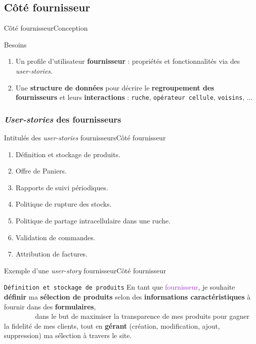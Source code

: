 \documentclass[usenames,dvipsnames]{beamer}
\begin{document}
\subsection{Côté fournisseur}
\begin{frame}{Côté fournisseur}{Conception}
\begin{block}{Besoins}
\begin{enumerate}
  \item Un profile d'utilisateur \textbf{fournisseur} : propriétés et fonctionnalités via des \textit{user-stories}.
  \item Une \textbf{structure de données} pour décrire le \textbf{regroupement des fournisseurs} et leurs \textbf{interactions} : \texttt{ruche}, \texttt{opérateur cellule}, \texttt{voisins}, $\dots$
\end{enumerate}
\end{block}
\end{frame}

\subsubsection*{\protect\textit{User-stories} des fournisseurs}
\begin{frame}{Intitulés des \textit{user-stories} fournisseurs}{Côté fournisseur}
\begin{enumerate}
  \item Définition et stockage de produits.
  \item Offre de Paniers.
  \item Rapports de suivi périodiques.
  \item Politique de rupture des stocks.
  \item Politique de partage intracellulaire dans une ruche.
  \item Validation de commandes.
  \item Attribution de factures.
\end{enumerate}
\end{frame}

\begin{frame}{Exemple d'une \textit{user-story} fournisseur}{Côté fournisseur}
\begin{block}{\textcolor{Sepia}{\texttt{Définition et stockage de produits}}}
En tant que \textcolor{DarkOrchid}{fournisseur}, je souhaite {\color{BrickRed} \textbf{définir} ma \textbf{sélection de produits} selon des \textbf{informations caractéristiques} à fournir dans des \textbf{formulaires}},\\
~~~~~~~~~dans le but de {\color{OliveGreen}maximiser la transparence de mes produits pour gagner la fidelité de mes clients, tout en \textbf{gérant} (création, modification, ajout, suppression) ma sélection à travers le site}.
\end{block}
\end{frame}
\end{document}
